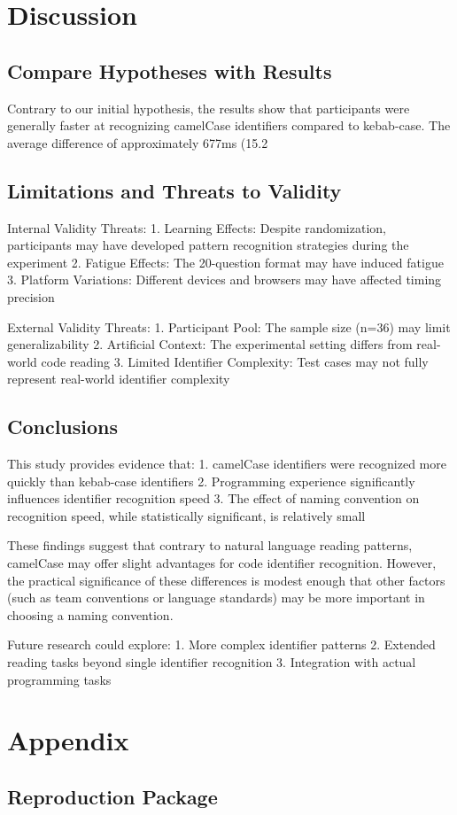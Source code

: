 \documentclass[unicode,11pt,a4paper,oneside,numbers=endperiod,openany]{scrartcl}
\begin{document}
\section{Discussion}
\subsection{Compare Hypotheses with Results}
Contrary to our initial hypothesis, the results show that participants were generally faster at recognizing camelCase identifiers compared to kebab-case. The average difference of approximately 677ms (15.2%

\subsection{Limitations and Threats to Validity}
Internal Validity Threats:
1. Learning Effects: Despite randomization, participants may have developed pattern recognition strategies during the experiment
2. Fatigue Effects: The 20-question format may have induced fatigue
3. Platform Variations: Different devices and browsers may have affected timing precision

External Validity Threats:
1. Participant Pool: The sample size (n=36) may limit generalizability
2. Artificial Context: The experimental setting differs from real-world code reading
3. Limited Identifier Complexity: Test cases may not fully represent real-world identifier complexity

\subsection{Conclusions}
This study provides evidence that:
1. camelCase identifiers were recognized more quickly than kebab-case identifiers
2. Programming experience significantly influences identifier recognition speed
3. The effect of naming convention on recognition speed, while statistically significant, is relatively small

These findings suggest that contrary to natural language reading patterns, camelCase may offer slight advantages for code identifier recognition. However, the practical significance of these differences is modest enough that other factors (such as team conventions or language standards) may be more important in choosing a naming convention.

Future research could explore:
1. More complex identifier patterns
2. Extended reading tasks beyond single identifier recognition
3. Integration with actual programming tasks


\section{Appendix}

\subsection{Reproduction Package}
\end{document}
